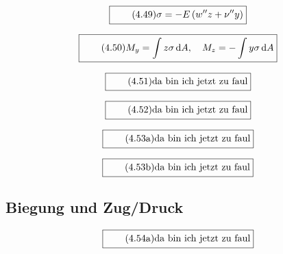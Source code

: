 \documentclass[11pt]{article}
\newcommand{\1}{ {\mathds{1}} }
\newcommand{\td}{\,\text{d}}
\begin{document}
\begin{multicols}{2}
		\begin{equation}
			\boxed{
				\tag{4.49}
				\begin{split}
					\sigma = -E\left(w'' z + \nu'' y\right)
				\end{split}
			}
		\end{equation}
		
		\begin{equation}
			\boxed{
				\tag{4.50}
				\begin{split}
					M_y = \int z\sigma\td A , \quad M_z = - \int y \sigma \td A
				\end{split}
			}
		\end{equation}
		
		\begin{equation}
			\boxed{
				\tag{4.51}
				\begin{split}
					\text{da bin ich jetzt zu faul}
				\end{split}
			}
		\end{equation}
		
		\begin{equation}
			\boxed{
				\tag{4.52}
				\begin{split}
					\text{da bin ich jetzt zu faul}
				\end{split}
			}
		\end{equation}

		\begin{equation}
			\boxed{
				\tag{4.53a}
				\begin{split}
					\text{da bin ich jetzt zu faul}
				\end{split}
			}
		\end{equation}

		\begin{equation}
			\boxed{
				\tag{4.53b}
				\begin{split}
					\text{da bin ich jetzt zu faul}
				\end{split}
			}
		\end{equation}

		\subsection{Biegung und Zug/Druck}

		\begin{equation}
			\boxed{
				\tag{4.54a}
				\begin{split}
					\text{da bin ich jetzt zu faul}
				\end{split}
			}
		\end{equation}
		

\end{multicols}
\end{document}
